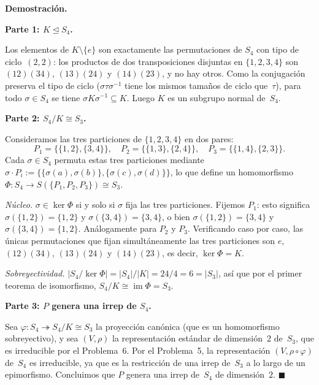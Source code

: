\documentclass[10pt,a4paper]{article}
\newcommand{\inlinehead}[2][repblue]{%
  \par\smallskip
  {\color{#1}\bfseries #2.}\hspace{0.45em}%
}
\begin{document}
\inlinehead{Demostración}

\inlinehead[repteal]{Parte 1: $K\trianglelefteq S_4$}
Los elementos de $K\setminus\{e\}$ son exactamente las permutaciones de
$S_4$ con tipo de ciclo~$(2,2)$: los productos de dos transposiciones
disjuntas en $\{1,2,3,4\}$ son $(12)(34)$, $(13)(24)$ y $(14)(23)$, y no
hay otros. Como la conjugación preserva el tipo de ciclo
($\sigma\tau\sigma^{-1}$ tiene los mismos tamaños de ciclo que~$\tau$), para
todo $\sigma\in S_4$ se tiene $\sigma K\sigma^{-1}\subseteq K$. Luego $K$
es un subgrupo normal de~$S_4$.

\inlinehead[repteal]{Parte 2: $S_4/K\cong S_3$}
Consideramos las tres particiones de $\{1,2,3,4\}$ en dos pares:
\[
  P_1=\bigl\{\{1,2\},\{3,4\}\bigr\},\quad
  P_2=\bigl\{\{1,3\},\{2,4\}\bigr\},\quad
  P_3=\bigl\{\{1,4\},\{2,3\}\bigr\}.
\]
Cada $\sigma\in S_4$ permuta estas tres particiones mediante
$\sigma\cdot P_i:=\bigl\{\{\sigma(a),\sigma(b)\},\{\sigma(c),\sigma(d)\}\bigr\}$,
lo que define un homomorfismo $\Phi\colon S_4\to S(\{P_1,P_2,P_3\})\cong S_3$.

\textit{Núcleo.} $\sigma\in\ker\Phi$ si y solo si $\sigma$ fija las tres
particiones. Fijemos $P_1$: esto significa $\sigma(\{1,2\})=\{1,2\}$ y
$\sigma(\{3,4\})=\{3,4\}$, o bien $\sigma(\{1,2\})=\{3,4\}$ y
$\sigma(\{3,4\})=\{1,2\}$. Análogamente para $P_2$ y $P_3$. Verificando
caso por caso, las únicas permutaciones que fijan simultáneamente las tres
particiones son $e$, $(12)(34)$, $(13)(24)$ y $(14)(23)$, es decir,
$\ker\Phi=K$.

\textit{Sobreyectividad.} $|S_4/\!\ker\Phi|=|S_4|/|K|=24/4=6=|S_3|$, así
que por el primer teorema de isomorfismo,
$S_4/K\cong\operatorname{im}\Phi=S_3$.

\inlinehead[repteal]{Parte 3: $P$ genera una irrep de $S_4$}
Sea $\varphi\colon S_4\twoheadrightarrow S_4/K\cong S_3$ la proyección
canónica (que es un homomorfismo sobreyectivo), y sea $(V,\rho)$ la
representación estándar de dimensión~$2$ de~$S_3$, que es irreducible por el
Problema~6. Por el Problema~5, la representación
$(V,\rho\circ\varphi)$ de~$S_4$ es irreducible, ya que es la restricción de
una irrep de~$S_3$ a lo largo de un epimorfismo. Concluimos que $P$ genera
una irrep de~$S_4$ de dimensión~$2$.
\hfill$\blacksquare$
\end{document}
